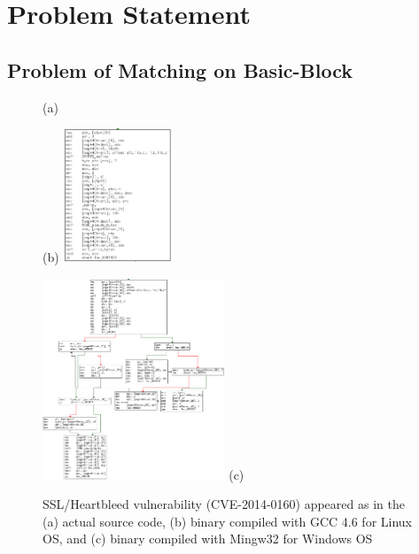 
\section{Problem Statement} \label{sec:prob_state}
\subsection{Problem of Matching on Basic-Block }




\begin{figure}[ht]
 \begin{minipage}{.3\textwidth}

   (a)
\end{minipage}
 \begin{minipage}{.3\textwidth}
  \centering
     (b)
  \includegraphics[height=4cm]{srj-figures/srj-gcc.png}
  \end{minipage}
  \begin{minipage}{.3\textwidth}

   \centering
  \includegraphics[height=6cm]{srj-figures/srj-mingw32.png}
     (c)
   \end{minipage}
  \caption{SSL/Heartbleed vulnerability (CVE-2014-0160) appeared as in the (a) actual source code, (b) binary compiled with GCC 4.6 for Linux OS, and (c) binary compiled with Mingw32 for Windows OS} \label{fig:prob_stat}
\end{figure}

